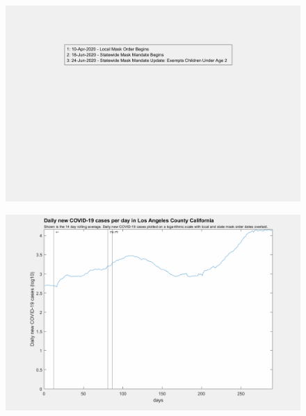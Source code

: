 \documentclass[]{article}
\begin{document}
\begin{figure}[!h]
	\includegraphics[width=\linewidth]{legends/los_angeles_mask_order_legend.png}
	\caption{}
	\label{fig:legends/los_angeles_mask_order_legendLabel}
\end{figure}

\begin{figure}[!h]
	\includegraphics[width=\linewidth]{images/los_angeles_mask_order_log.png}
	\caption{}
	\label{fig:images/los_angeles_mask_order_logLabel}
\end{figure}
\end{document}
